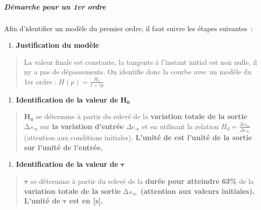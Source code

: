 \hypertarget{duxe9marche-pour-un-1er-ordre}{%
\subparagraph*{\texorpdfstring{Démarche pour un 1er ordre }{Démarche pour un 1er ordre }}\label{duxe9marche-pour-un-1er-ordre}}

Afin d'identifier un modèle du premier ordre, il faut suivre les étapes suivantes~:

\begin{enumerate}
\def\labelenumi{\arabic{enumi}.}
\item
  \textbf{Justification du modèle}
\end{enumerate}

\begin{quote}
La valeur finale est constante, la tangente à l'instant initial est non nulle, il n\textquotesingle y a pas de dépassements. On identifie donc la courbe avec un modèle du 1er ordre : \(H(p) = \frac{H_{0}}{1 + \tau p}\)
\end{quote}

\begin{enumerate}
\def\labelenumi{\arabic{enumi}.}
\setcounter{enumi}{1}
\item
  \textbf{Identification de la valeur de} \(\mathbf{H}_{\mathbf{0}}\)
\end{enumerate}

\begin{quote}
\(\mathbf{H}_{\mathbf{0}}\) se détermine à partir du relevé de la \textbf{variation totale de la sortie} \({\mathrm{\Delta}s}_{\infty}\ \)sur \textbf{la variation d'entrée} \(\Delta e_{\infty}\ \)et en utilisant la relation \(H_{0} = \frac{{\mathrm{\Delta}s}_{\infty}}{\Delta e_{\infty}}\) (attention aux conditions initiales). \textbf{L'unité de est l'unité de la sortie sur l'unité de l'entrée.}
\end{quote}

\begin{enumerate}
\def\labelenumi{\arabic{enumi}.}
\setcounter{enumi}{2}
\item
  \textbf{Identification de la valeur de} \(\mathbf{\tau}\)
\end{enumerate}

\begin{quote}
\(\mathbf{\tau}\) se détermine à partir du relevé de la \textbf{durée pour atteindre} \textbf{63\%} de la \textbf{variation totale de la sortie} \({\mathrm{\Delta}s}_{\infty}\ \ \)\textbf{(attention aux valeurs initiales). L'unité de} \(\mathbf{\tau}\) \textbf{est en {[}s{]}.}
\end{quote}

